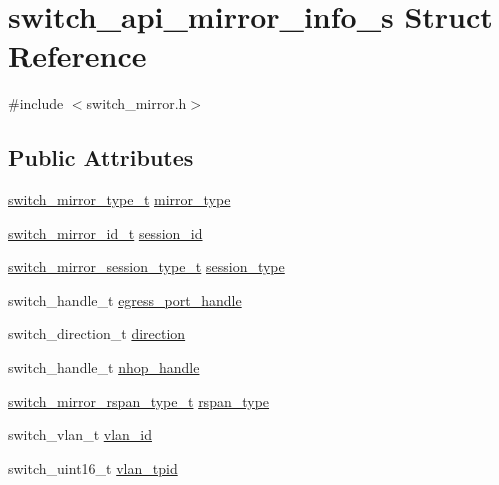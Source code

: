 \hypertarget{structswitch__api__mirror__info__s}{\section{switch\+\_\+api\+\_\+mirror\+\_\+info\+\_\+s Struct Reference}
\label{structswitch__api__mirror__info__s}
}


{\ttfamily \#include $<$switch\+\_\+mirror.\+h$>$}

\subsection*{Public Attributes}
\begin{DoxyCompactItemize}
\item 
\hyperlink{group__Mirror_gab7f122c0c6b29dbe9f63ceea0603a2c9}{switch\+\_\+mirror\+\_\+type\+\_\+t} \hyperlink{structswitch__api__mirror__info__s_a96ea1cd04b4fd76d6b0ca9d7479a2e4a}{mirror\+\_\+type}
\item 
\hyperlink{group__Mirror_gaf5ec4a656bd46aede10f08c5dfd3a09c}{switch\+\_\+mirror\+\_\+id\+\_\+t} \hyperlink{structswitch__api__mirror__info__s_a49fee648e823a1c3c8ea4a129edd2dc5}{session\+\_\+id}
\item 
\hyperlink{group__Mirror_ga0ae970af72459bcb4f7baee3d004bbca}{switch\+\_\+mirror\+\_\+session\+\_\+type\+\_\+t} \hyperlink{structswitch__api__mirror__info__s_a2d4737f4feb67c11f4ccfdfb4edc0e15}{session\+\_\+type}
\item 
switch\+\_\+handle\+\_\+t \hyperlink{structswitch__api__mirror__info__s_af332b7903dcd17f278b9ed08a2e679e7}{egress\+\_\+port\+\_\+handle}
\item 
switch\+\_\+direction\+\_\+t \hyperlink{structswitch__api__mirror__info__s_aabe4901c09dc2b839446f723d82cdd7a}{direction}
\item 
switch\+\_\+handle\+\_\+t \hyperlink{structswitch__api__mirror__info__s_a5adec0aa52730d8bf67e18a71b46f00f}{nhop\+\_\+handle}
\item 
\hyperlink{group__Mirror_gaca455b8eb6709bf2398d9565dd2afb73}{switch\+\_\+mirror\+\_\+rspan\+\_\+type\+\_\+t} \hyperlink{structswitch__api__mirror__info__s_a2620074b2897938812ee23aca2af7d4b}{rspan\+\_\+type}
\item 
switch\+\_\+vlan\+\_\+t \hyperlink{structswitch__api__mirror__info__s_ab0edc988263aeafd90f558f8701d5cf1}{vlan\+\_\+id}
\item 
switch\+\_\+uint16\+\_\+t \hyperlink{structswitch__api__mirror__info__s_a3fc15780339e394d76ffb7ea8f2f5649}{vlan\+\_\+tpid}

\end{DoxyCompactItemize}
